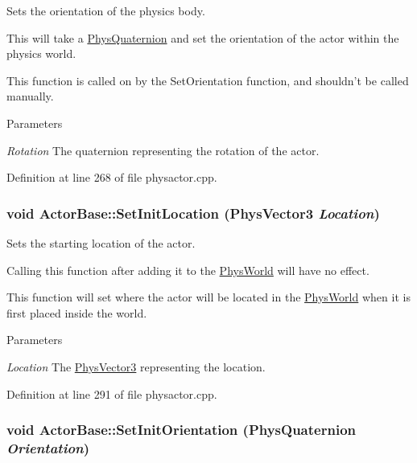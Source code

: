 Sets the orientation of the physics body. 

This will take a \hyperlink{classPhysQuaternion}{PhysQuaternion} and set the orientation of the actor within the physics world. \par
 This function is called on by the SetOrientation function, and shouldn't be called manually. 
\begin{DoxyParams}{Parameters}
\item[{\em Rotation}]The quaternion representing the rotation of the actor. \end{DoxyParams}


Definition at line 268 of file physactor.cpp.

\hypertarget{classActorBase_ac118fc21f89d067d987d511b444f7d55}{
\subsubsection[{SetInitLocation}]{\setlength{\rightskip}{0pt plus 5cm}void ActorBase::SetInitLocation ({\bf PhysVector3} {\em Location})}}
\label{dd/d7b/classActorBase_ac118fc21f89d067d987d511b444f7d55}


Sets the starting location of the actor. 

Calling this function after adding it to the \hyperlink{classPhysWorld}{PhysWorld} will have no effect. \par
 This function will set where the actor will be located in the \hyperlink{classPhysWorld}{PhysWorld} when it is first placed inside the world. 
\begin{DoxyParams}{Parameters}
\item[{\em Location}]The \hyperlink{classPhysVector3}{PhysVector3} representing the location. \end{DoxyParams}


Definition at line 291 of file physactor.cpp.

\hypertarget{classActorBase_a72e2d0064c3e4c4d8937f490397a333f}{
\subsubsection[{SetInitOrientation}]{\setlength{\rightskip}{0pt plus 5cm}void ActorBase::SetInitOrientation ({\bf PhysQuaternion} {\em Orientation})}}
\label{dd/d7b/classActorBase_a72e2d0064c3e4c4d8937f490397a333f}


